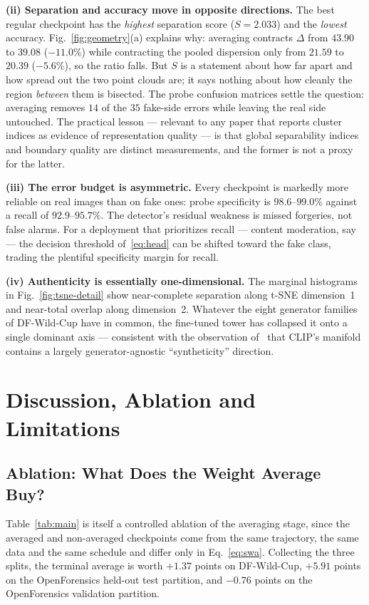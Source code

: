 \documentclass[10pt,journal]{IEEEtran}
\begin{document}
\textbf{(ii) Separation and accuracy move in opposite directions.} The best
regular checkpoint has the \emph{highest} separation score
($S=2.033$) and the \emph{lowest} accuracy. Fig.~\ref{fig:geometry}(a)
explains why: averaging contracts $\Delta$ from $43.90$ to $39.08$ ($-11.0\%$)
while contracting the pooled dispersion only from $21.59$ to $20.39$
($-5.6\%$), so the ratio falls. But $S$ is a statement about how far apart and
how spread out the two point clouds are; it says nothing about how cleanly the
region \emph{between} them is bisected. The probe confusion matrices settle
the question: averaging removes $14$ of the $35$ fake-side errors while
leaving the real side untouched. The practical lesson --- relevant to any
paper that reports cluster indices as evidence of representation quality --- is
that global separability indices and boundary quality are distinct
measurements, and the former is not a proxy for the latter.

\textbf{(iii) The error budget is asymmetric.} Every checkpoint is markedly
more reliable on real images than on fake ones: probe specificity is
$98.6$--$99.0\%$ against a recall of $92.9$--$95.7\%$. The detector's residual
weakness is missed forgeries, not false alarms. For a deployment that
prioritizes recall --- content moderation, say --- the decision threshold
of~\eqref{eq:head} can be shifted toward the fake class, trading the plentiful
specificity margin for recall.

\textbf{(iv) Authenticity is essentially one-dimensional.} The marginal
histograms in Fig.~\ref{fig:tsne-detail} show near-complete separation along
t-SNE dimension~1 and near-total overlap along dimension~2. Whatever the
eight generator families of DF-Wild-Cup have in common, the fine-tuned tower
has collapsed it onto a single dominant axis --- consistent with the
observation of~\cite{ojha2023universal} that CLIP's manifold contains a
largely generator-agnostic ``syntheticity'' direction.

\section{Discussion, Ablation and Limitations}\label{sec:discussion}

\subsection{Ablation: What Does the Weight Average Buy?}
Table~\ref{tab:main} is itself a controlled ablation of the averaging stage,
since the averaged and non-averaged checkpoints come from the same trajectory,
the same data and the same schedule and differ only in
Eq.~\eqref{eq:swa}. Collecting the three splits, the terminal average is worth
$+1.37$ points on DF-Wild-Cup, $+5.91$ points on the OpenForensics held-out
test partition, and $-0.76$ points on the OpenForensics validation partition.
\end{document}
